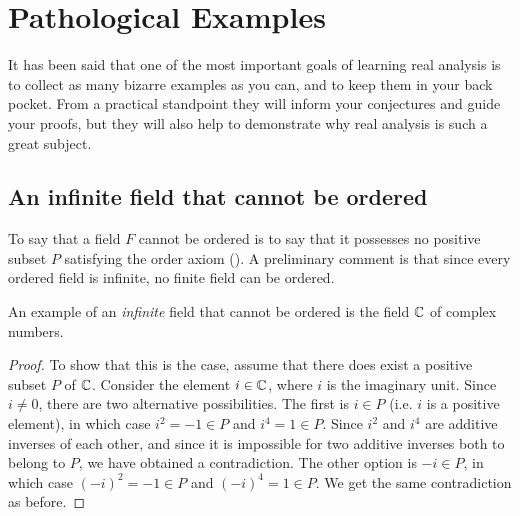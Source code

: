 \chapter{Pathological Examples}
It has been said that one of the most important goals of learning
real analysis is to collect as many bizarre examples as you can, and
to keep them in your back pocket. From a practical standpoint they
will inform your conjectures and guide your proofs, but they will
also help to demonstrate why real analysis is such a great subject.

\section{An infinite field that cannot be ordered}
To say that a field $F$ cannot be ordered is to say that it possesses
no positive subset $P$ satisfying the order axiom
(). A preliminary comment is that since every
ordered field is infinite, no finite field can be ordered.

An example of an \textit{infinite} field that cannot be ordered is
the field $\mathbb C$ of complex numbers.

\begin{proof}{7}
  To show that this is the case, assume that there does exist a
  positive subset $P$ of $\mathbb C$. Consider the element $i \in \mathbb C$,
  where $i$ is the imaginary unit. Since $i \neq 0$, there are two
  alternative possibilities. The first is $i \in P$ (i.e. $i$ is a
  positive element), in which case $i^2 = -1 \in P$ and $i^4 = 1 \in
  P$. Since $i^2$ and $i^4$ are additive inverses of each other, and
  since it is impossible for two additive inverses both to belong to
  $P$, we have obtained a contradiction. The other option is $-i \in
  P$, in which case $(-i)^2 = -1 \in P$ and $(-i)^4 = 1 \in P$. We
  get the same contradiction as before.
\end{proof}
